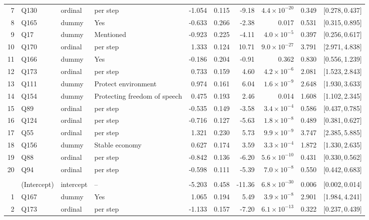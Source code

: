 \begin{landscape}
\begin{longtable}{r l l l r r r r r c}
7 & Q130 & ordinal & per step & -1.054 & 0.115 & -9.18 & $4.4{\times}10^{-20}$ & 0.349 & [0.278,\,0.437] &  \\
8 & Q165 & dummy & Yes & -0.633 & 0.266 & -2.38 & 0.017 & 0.531 & [0.315,\,0.895] &  \\
9 & Q17 & dummy & Mentioned & -0.923 & 0.225 & -4.11 & $4.0{\times}10^{-5}$ & 0.397 & [0.256,\,0.617] &  \\
10 & Q170 & ordinal & per step & 1.333 & 0.124 & 10.71 & $9.0{\times}10^{-27}$ & 3.791 & [2.971,\,4.838] &  \\
\rowcolor{gray!12} 11 & Q166 & dummy & Yes & -0.186 & 0.204 & -0.91 & 0.362 & 0.830 & [0.556,\,1.239] &  \\
12 & Q173 & ordinal & per step & 0.733 & 0.159 & 4.60 & $4.2{\times}10^{-6}$ & 2.081 & [1.523,\,2.843] &  \\
13 & Q111 & dummy & Protect environment & 0.974 & 0.161 & 6.04 & $1.6{\times}10^{-9}$ & 2.648 & [1.930,\,3.633] &  \\
14 & Q154 & dummy & Protecting freedom of speech & 0.475 & 0.193 & 2.46 & 0.014 & 1.608 & [1.102,\,2.345] &  \\
15 & Q89 & ordinal & per step & -0.535 & 0.149 & -3.58 & $3.4{\times}10^{-4}$ & 0.586 & [0.437,\,0.785] &  \\
16 & Q124 & ordinal & per step & -0.716 & 0.127 & -5.63 & $1.8{\times}10^{-8}$ & 0.489 & [0.381,\,0.627] &  \\
17 & Q55 & ordinal & per step & 1.321 & 0.230 & 5.73 & $9.9{\times}10^{-9}$ & 3.747 & [2.385,\,5.885] &  \\
18 & Q156 & dummy & Stable economy & 0.627 & 0.174 & 3.59 & $3.3{\times}10^{-4}$ & 1.872 & [1.330,\,2.635] &  \\
19 & Q88 & ordinal & per step & -0.842 & 0.136 & -6.20 & $5.6{\times}10^{-10}$ & 0.431 & [0.330,\,0.562] &  \\
20 & Q94 & ordinal & per step & -0.598 & 0.111 & -5.39 & $7.0{\times}10^{-8}$ & 0.550 & [0.442,\,0.683] &  \\
\addlinespace[4pt]
\multicolumn{9}{l}{\textbf{Cluster 3} \quad \small $n = 2579$ ($n_{\text{in}} = 991$), AIC $= 1503.6$, residual deviance $= 1461.6$ on 2558 df}\\[2pt]
 & (Intercept) & intercept & -- & -5.203 & 0.458 & -11.36 & $6.8{\times}10^{-30}$ & 0.006 & [0.002,\,0.014] &  \\
1 & Q167 & dummy & Yes & 1.065 & 0.194 & 5.49 & $3.9{\times}10^{-8}$ & 2.901 & [1.984,\,4.241] &  \\
2 & Q173 & ordinal & per step & -1.133 & 0.157 & -7.20 & $6.1{\times}10^{-13}$ & 0.322 & [0.237,\,0.439] &  \\

\end{longtable}
\end{landscape}
